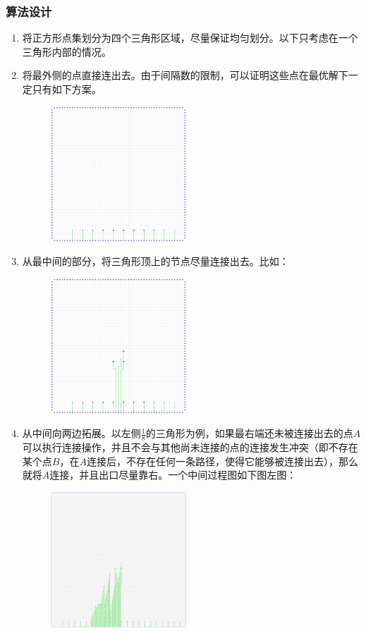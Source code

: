 \subsubsection{算法设计}
\qquad
\begin{enumerate}
	\item 将正方形点集划分为四个三角形区域，尽量保证均匀划分。以下只考虑在一个三角形内部的情况。
	\item 将最外侧的点直接连出去。由于间隔数的限制，可以证明这些点在最优解下一定只有如下方案。
	\begin{figure}[H]
		\centering
		\includegraphics[width=2in]{12_1.png}
	\end{figure}
	\item 从最中间的部分，将三角形顶上的节点尽量连接出去。比如：
	\begin{figure}[H]
		\centering
		\includegraphics[width=2in]{12_2.png}
	\end{figure}
	\item 从中间向两边拓展。以左侧$\frac{1}{8}$的三角形为例，如果最右端还未被连接出去的点$A$可以执行连接操作，并且不会与其他尚未连接的点的连接发生冲突（即不存在某个点$B$，在$A$连接后，不存在任何一条路径，使得它能够被连接出去），那么就将$A$连接，并且出口尽量靠右。一个中间过程图如下图左图：
	\begin{figure}[H]
		\centering
		\includegraphics[width=2in]{22_3.png}

\end{figure}
\end{enumerate}
